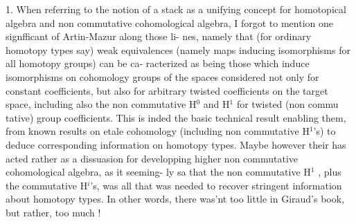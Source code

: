 1.  When referring  to the notion of a stack as a unifying concept
for homotopical algebra and non commutative cohomological algebra,  I
forgot to mention one signfficant  of Artin-Mazur along those li-%
nes,  namely that (for ordinary homotopy types say) weak equivalences
(namely maps inducing isomorphisms for all homotopy groups)  can be ca-%
racterized as being those which induce isomorphisms on cohomology groups
 of the spaces considered not only for constant coefficients,  but
also for  arbitrary twisted coefficients on the target space,
including also the non commutative H$^{0}$ and H$^{1}$ for twisted  (non commu%
tative) group coefficients.  This is inded the basic technical result
enabling them,  from known results on etale cohomology (including non
commutative H$^{1}$'s) to deduce corresponding information on homotopy types.
Maybe however  their  has acted rather as a dissuasion for
developping higher non commutative cohomological algebra,  as it seeming-%
\margin{-}ly sa that the non commutative H$^{1}$ ,  plus the commutative H$^{i}$\hand{\unsure{,}}'s, was
all that was needed to recover stringent information about homotopy
types.  In other words,  there was'nt too little in Giraud's book,
but rather,  too much !
